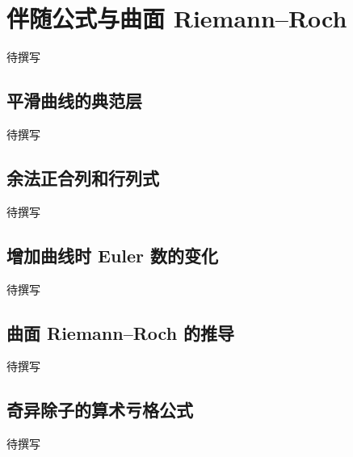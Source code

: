 
% 
% 

\section{伴随公式与曲面 Riemann–Roch}
\label{g5:sec:2503}

待撰写

\subsection{平滑曲线的典范层}
\label{g5:subsec:2503:01}
待撰写

\subsection{余法正合列和行列式}
\label{g5:subsec:2503:02}
待撰写

\subsection{增加曲线时 Euler 数的变化}
\label{g5:subsec:2503:03}
待撰写

\subsection{曲面 Riemann–Roch 的推导}
\label{g5:subsec:2503:04}
待撰写

\subsection{奇异除子的算术亏格公式}
\label{g5:subsec:2503:05}
待撰写
